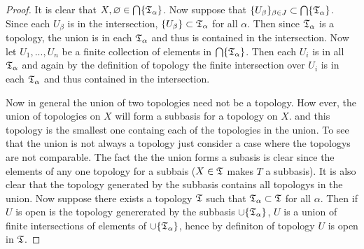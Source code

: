 \begin{proof}
    It is clear that $X, \varnothing \in \bigcap \{\mathfrak{T}_\alpha\}$. Now suppose that $\{U_\beta\}_{\beta \in J} \subset \bigcap \{\mathfrak{T}_\alpha\}$. 
    Since each $U_\beta$ is in the intersection, $\{U_\beta\} \subset \mathfrak{T}_\alpha$ for all $\alpha$. Then since $\mathfrak{T}_\alpha$ is a topology, 
    the union is in each $\mathfrak{T}_\alpha$ and thus is contained in the intersection. Now let $U_1, ..., U_n$ be a finite collection of elements in 
    $\bigcap \{\mathfrak{T}_\alpha\}$. Then each $U_i$ is in all $\mathfrak{T}_\alpha$ and again by the definition of topology the finite intersection over $U_i$ is in each 
    $\mathfrak{T}_\alpha$ and thus contained in the intersection. 

    Now in general the union of two topologies need not be a topology. How ever, the union of topologies on $X$ will form a subbasis for a topology on $X$. 
    and this topology is the smallest one containg each of the topologies in the union. To see that the union is not always a topology just consider a case where 
    the topologys are not comparable. The fact the the union forms a subasis is clear since the elements of any one topology for a subbais ($X \in \mathfrak{T}$ makes $T$ a subbasis). 
    It is also clear that the topology generated by the subbasis contains all topologys in the union. Now suppose there exists a topology $\mathfrak{T}$ such that $\mathfrak{T}_\alpha \subset \mathfrak{T}$ for all $\alpha$. 
    Then if $U$ is open is the topology genererated by the subbasis $\cup \{\mathfrak{T}_\alpha\}$, $U$ is a union of finite intersections of elements of $\cup \{\mathfrak{T}_\alpha\}$, hence 
    by definiton of topology $U$ is open in $\mathfrak{T}$. 
     
\end{proof}
    

